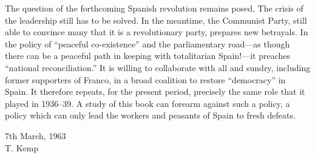 \begin{sloppypar}
The question of the forthcoming Spanish revolution remains posed. The crisis of the leadership still has to be solved. In the meantime, the Communist Party, still able to convince many that it is a revolutionary party, prepares new betrayals. In the policy of ``peaceful co-existence'' and the parliamentary road---as though there can be a peaceful path in keeping with totalitarian Spain!---it preaches ``national reconciliation.'' It is willing to collaborate with all and sundry, including former supporters of Franco, in a broad coalition to restore ``democracy'' in Spain. It therefore repeats, for the present period, precisely the same role that it played in 1936--39. A study of this book can forearm against such a policy, a policy which can only lead the workers and peasants of Spain to fresh defeats.
\end{sloppypar}

\begin{flushright}
  7th March, 1963 \\
  T. Kemp
\end{flushright}